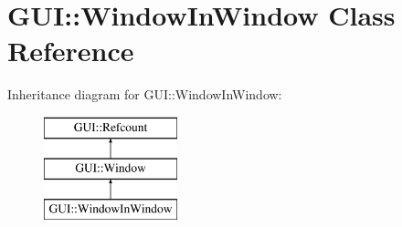 \hypertarget{classGUI_1_1WindowInWindow}{\section{G\-U\-I\-:\-:Window\-In\-Window Class Reference}
\label{classGUI_1_1WindowInWindow}
}
Inheritance diagram for G\-U\-I\-:\-:Window\-In\-Window\-:\begin{figure}[H]
\begin{center}
\leavevmode
\includegraphics[height=3.000000cm]{classGUI_1_1WindowInWindow}
\end{center}
\end{figure}
